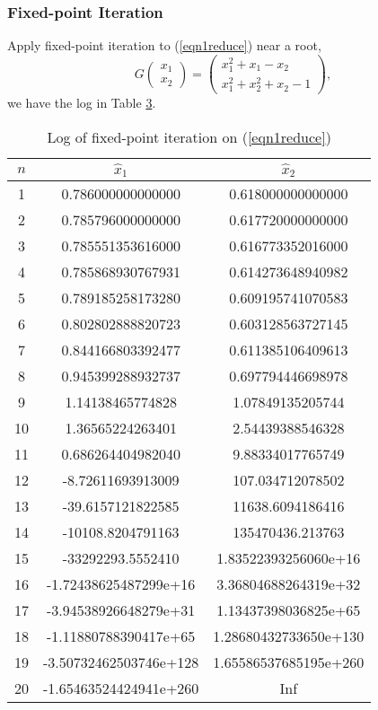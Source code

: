 \begin{table}[H]
\subsubsection{Fixed-point Iteration}
Apply fixed-point iteration to (\ref{eqn1reduce}) near a root,
\[ G\begin{pmatrix} x_1\\ x_2\end{pmatrix}=\begin{pmatrix} x_1^2+x_1-x_2 \\ x_1^2+x_2^2+x_2-1 \end{pmatrix}, \]
we have the log in Table \ref{logeqn1fp}.
\ifnum{}
	\begin{table}[H]
\else
	\begin{table}[htbp]
\fi
	\centering
	\begin{tabular}{|c|c|c|}
	\hline
	\(n\)	&	\(\hat{x}_1\)	&	\(\hat{x}_2\)	\\	\hline
	1	&	0.786000000000000		&	0.618000000000000		\\	\hline
	2	&	0.785796000000000		&	0.617720000000000		\\	\hline
	3	&	0.785551353616000		&	0.616773352016000		\\	\hline
	4	&	0.785868930767931		&	0.614273648940982		\\	\hline
	5	&	0.789185258173280		&	0.609195741070583		\\	\hline
	6	&	0.802802888820723		&	0.603128563727145		\\	\hline
	7	&	0.844166803392477		&	0.611385106409613		\\	\hline
	8	&	0.945399288932737		&	0.697794446698978		\\	\hline
	9	&	1.14138465774828		&	1.07849135205744		\\	\hline
	10	&	1.36565224263401		&	2.54439388546328		\\	\hline
	11	&	0.686264404982040		&	9.88334017765749		\\	\hline
	12	&	-8.72611693913009		&	107.034712078502		\\	\hline
	13	&	-39.6157121822585		&	11638.6094186416		\\	\hline
	14	&	-10108.8204791163		&	135470436.213763		\\	\hline
	15	&	-33292293.5552410		&	1.83522393256060e+16	\\	\hline
	16	&	-1.72438625487299e+16	&	3.36804688264319e+32	\\	\hline
	17	&	-3.94538926648279e+31	&	1.13437398036825e+65	\\	\hline
	18	&	-1.11880788390417e+65	&	1.28680432733650e+130	\\	\hline
	19	&	-3.50732462503746e+128	&	1.65586537685195e+260	\\	\hline
	20	&	-1.65463524424941e+260	&	Inf						\\	\hline
	\end{tabular}
	\caption{Log of fixed-point iteration on (\ref{eqn1reduce})}
	\label{logeqn1fp}
	\end{table}


\end{table}
\end{table}
